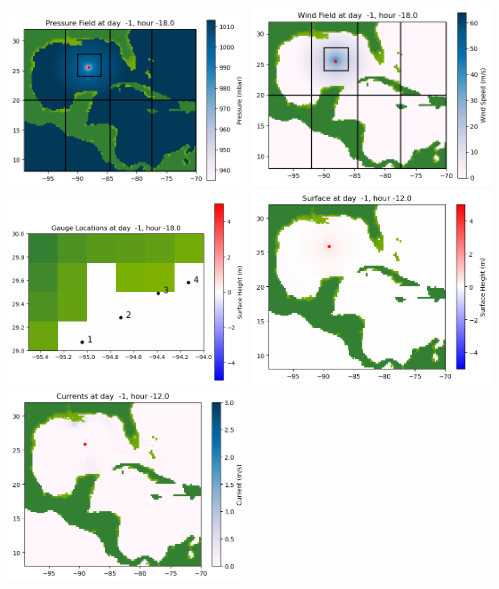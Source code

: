 \documentclass[11pt]{article}
\begin{document}
\includegraphics[width=0.475\textwidth]{frame0005fig1006.png}
\vskip 10pt 
\includegraphics[width=0.475\textwidth]{frame0005fig1007.png}
\includegraphics[width=0.475\textwidth]{frame0005fig1008.png}
\vskip 10pt 
\includegraphics[width=0.475\textwidth]{frame0006fig1001.png}
\includegraphics[width=0.475\textwidth]{frame0006fig1002.png}
\end{document}
